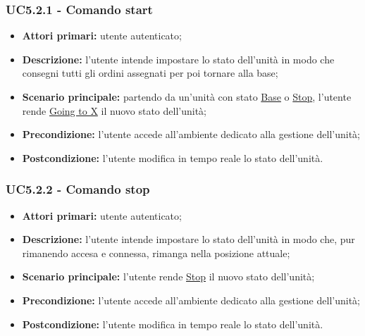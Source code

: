        \subsubsection{UC5.2.1 - Comando start}
        \begin{itemize}
            \item \textbf{Attori primari:} utente autenticato;
            \item \textbf{Descrizione:} l'utente intende impostare lo stato dell'unità in modo che consegni tutti gli ordini assegnati per poi tornare alla base;
            \item \textbf{Scenario principale:} partendo da un'unità con stato \underline{Base} o \underline{Stop}, l'utente rende \underline{Going to X} il nuovo stato dell'unità;
            \item \textbf{Precondizione:} l'utente accede all'ambiente dedicato alla gestione dell'unità;
            \item \textbf{Postcondizione:} l'utente modifica in tempo reale lo stato dell'unità.
        \end{itemize}

        \subsubsection{UC5.2.2 - Comando stop}
        \begin{itemize}
            \item \textbf{Attori primari:} utente autenticato;
            \item \textbf{Descrizione:} l'utente intende impostare lo stato dell'unità in modo che, pur rimanendo accesa e connessa, rimanga nella posizione attuale;
            \item \textbf{Scenario principale:} l'utente rende \underline{Stop} il nuovo stato dell'unità;
            \item \textbf{Precondizione:} l'utente accede all'ambiente dedicato alla gestione dell'unità;
            \item \textbf{Postcondizione:} l'utente modifica in tempo reale lo stato dell'unità.
        \end{itemize}

